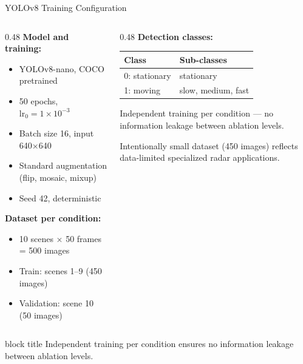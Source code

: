 \documentclass[aspectratio=169, 10pt]{beamer}
\newcommand{\keypoint}[1]{%
  \vfill
  \begin{beamercolorbox}[wd=\textwidth, dp=0.4em, leftskip=0.3cm]{block title}%
    \small #1%
  \end{beamercolorbox}%
}
\begin{document}
\begin{frame}{YOLOv8 Training Configuration}

\begin{columns}[T]
\begin{column}{0.48\textwidth}
  \textbf{Model and training:}
  \begin{itemize}
    \item YOLOv8-nano, COCO pretrained
    \item 50 epochs, $\text{lr}_0 = 1 \times 10^{-3}$
    \item Batch size 16, input 640$\times$640
    \item Standard augmentation (flip, mosaic, mixup)
    \item Seed 42, deterministic
  \end{itemize}

  \vspace{0.3cm}

  \textbf{Dataset per condition:}
  \begin{itemize}
    \item 10 scenes $\times$ 50 frames = 500 images
    \item Train: scenes 1--9 (450 images)
    \item Validation: scene 10 (50 images)
  \end{itemize}
\end{column}
\begin{column}{0.48\textwidth}
  \textbf{Detection classes:}

  \vspace{0.2cm}

  \begin{tabular}{@{}l l@{}}
    \toprule
    \textbf{Class} & \textbf{Sub-classes} \\
    \midrule
    0: stationary & stationary \\
    1: moving & slow, medium, fast \\
    \bottomrule
  \end{tabular}

  \vspace{0.4cm}

  Independent training per condition --- no information leakage between
  ablation levels.

  \vspace{0.3cm}

  Intentionally small dataset (450 images) reflects data-limited
  specialized radar applications.
\end{column}
\end{columns}

\keypoint{Independent training per condition ensures no information leakage between ablation levels.}
\end{frame}
\end{document}
